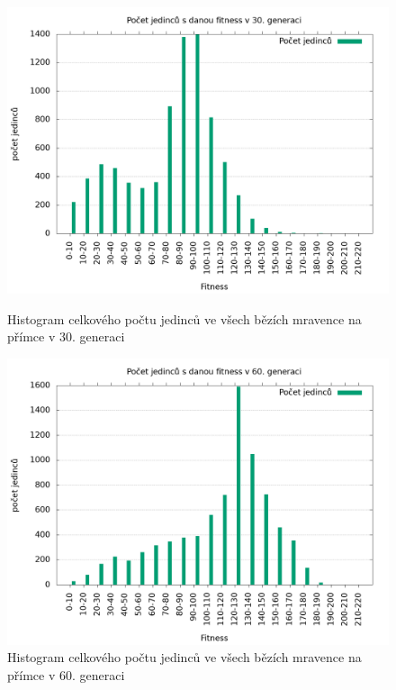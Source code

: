 \begin{figure}[h]
    \begin{minipage}[c]{0.48\linewidth}
        \includegraphics[width=\linewidth]{obrazky/mravenec_primka_fitnessHistogram30.png}
        \caption{Histogram celkového počtu jedinců ve všech bězích mravence na přímce v 30. generaci}
        \label{fig:mravenec_primka_histogram_30}
    \end{minipage}
    \hfill
    \begin{minipage}[c]{0.48\linewidth}
        \includegraphics[width=\linewidth]{obrazky/mravenec_primka_fitnessHistogram60.png}
        \caption{Histogram celkového počtu jedinců ve všech bězích mravence na přímce v 60. generaci}
        \label{fig:mravenec_primka_histogram_60}
    \end{minipage}
\end{figure}


